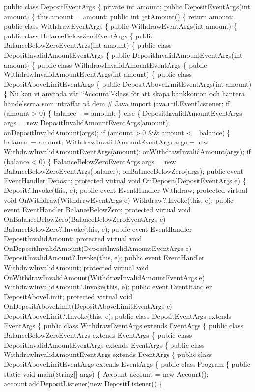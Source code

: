 public class DepositEventArgs \{ private int amount; public
DepositEventArgs(int amount) \{ this.amount = amount; public int
getAmount() \{ return amount; public class WithdrawEventArgs \{ public
WithdrawEventArgs(int amount) \{ public class BalanceBelowZeroEventArgs
\{ public BalanceBelowZeroEventArgs(int amount) \{ public class
DepositInvalidAmountEventArgs \{ public
DepositInvalidAmountEventArgs(int amount) \{ public class
WithdrawInvalidAmountEventArgs \{ public
WithdrawInvalidAmountEventArgs(int amount) \{ public class
DepositAboveLimitEventArgs \{ public DepositAboveLimitEventArgs(int
amount) \{ Nu kan vi använda vår ``Account''-klass för att skapa
bankkonton och hantera händelserna som inträffar på dem.\# Java import
java.util.EventListener; if (amount \textgreater{} 0) \{ balance +=
amount; \} else \{ DepositInvalidAmountEventArgs args = new
DepositInvalidAmountEventArgs(amount); onDepositInvalidAmount(args); if
(amount \textgreater{} 0 \&\& amount \textless= balance) \{ balance -=
amount; WithdrawInvalidAmountEventArgs args = new
WithdrawInvalidAmountEventArgs(amount); onWithdrawInvalidAmount(args);
if (balance \textless{} 0) \{ BalanceBelowZeroEventArgs args = new
BalanceBelowZeroEventArgs(balance); onBalanceBelowZero(args); public
event EventHandler Deposit; protected virtual void
OnDeposit(DepositEventArgs e) \{ Deposit?.Invoke(this, e); public event
EventHandler Withdraw; protected virtual void
OnWithdraw(WithdrawEventArgs e) Withdraw?.Invoke(this, e); public event
EventHandler BalanceBelowZero; protected virtual void
OnBalanceBelowZero(BalanceBelowZeroEventArgs e)
BalanceBelowZero?.Invoke(this, e); public event EventHandler
DepositInvalidAmount; protected virtual void
OnDepositInvalidAmount(DepositInvalidAmountEventArgs e)
DepositInvalidAmount?.Invoke(this, e); public event EventHandler
WithdrawInvalidAmount; protected virtual void
OnWithdrawInvalidAmount(WithdrawInvalidAmountEventArgs e)
WithdrawInvalidAmount?.Invoke(this, e); public event EventHandler
DepositAboveLimit; protected virtual void
OnDepositAboveLimit(DepositAboveLimitEventArgs e)
DepositAboveLimit?.Invoke(this, e); public class DepositEventArgs
extends EventArgs \{ public class WithdrawEventArgs extends EventArgs \{
public class BalanceBelowZeroEventArgs extends EventArgs \{ public class
DepositInvalidAmountEventArgs extends EventArgs \{ public class
WithdrawInvalidAmountEventArgs extends EventArgs \{ public class
DepositAboveLimitEventArgs extends EventArgs \{ public class Program \{
public static void main(String{[}{]} args) \{ Account account = new
Account(); account.addDepositListener(new DepositListener() \{
